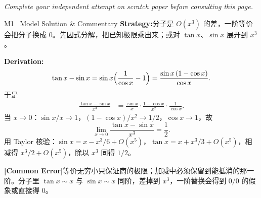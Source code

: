 \documentclass[a4paper,11pt]{article}
\newcommand{\alerttag}[1]{\textcolor{wine}{\sffamily\bfseries [#1]}}
\begin{document}
\vspace{1pt}
{\small\color{mist}\itshape\hspace{1pt} Complete your independent attempt on scratch paper before consulting this page.}

\vspace{8pt}

\begin{solution}{M1 \textperiodcentered\ Model Solution \& Commentary}
\textbf{Strategy:}\enspace 分子是 $O(x^3)$ 的差，一阶等价会把分子换成 $0$。先因式分解，把已知极限乘出来；或对 $\tan x$、$\sin x$ 展开到 $x^3$。

\vspace{2mm}
\textbf{Derivation:}\enspace
\[
  \tan x-\sin x=\sin x\Bigl(\frac{1}{\cos x}-1\Bigr)=\frac{\sin x\,(1-\cos x)}{\cos x}.
\]
于是
\begin{align*}
  \frac{\tan x-\sin x}{x^3}
  &=\frac{\sin x}{x}\cdot\frac{1-\cos x}{x^2}\cdot\frac{1}{\cos x}.
\end{align*}
当 $x\to 0$：$\sin x/x\to 1$，$(1-\cos x)/x^2\to 1/2$，$\cos x\to 1$，故
\[
  \lim_{x\to 0}\frac{\tan x-\sin x}{x^3}=\frac{1}{2}.
\]
用 Taylor 核验：$\sin x=x-x^3/6+O(x^5)$，$\tan x=x+x^3/3+O(x^5)$，相减得 $x^3/2+O(x^5)$，除以 $x^3$ 同得 $1/2$。

\begin{warnbox}
\alerttag{Common Error}\enspace 等价无穷小只保证商的极限；加减中必须保留到能抵消的那一阶。分子里 $\tan x\sim x$ 与 $\sin x\sim x$ 同阶，差掉到 $x^3$，一阶替换会得到 $0/0$ 的假象或直接得 $0$。
\end{warnbox}
\end{solution}

\vspace{6pt}
\end{document}
